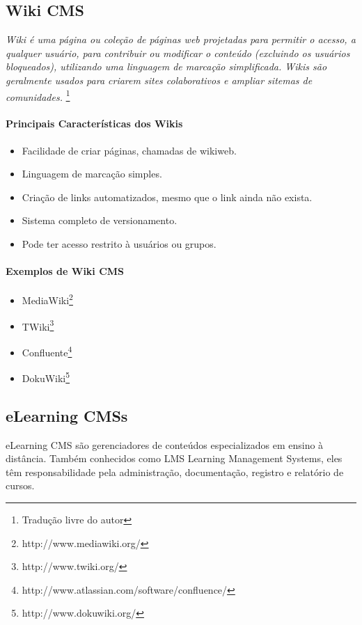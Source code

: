 \subsection{Wiki CMS} 

\emph{Wiki é uma página ou coleção de páginas web projetadas para permitir o acesso, a qualquer usuário, para contribuir ou modificar o conteúdo (excluindo os usuários bloqueados), utilizando uma linguagem de marcação simplificada. Wikis são geralmente usados para criarem sites colaborativos e ampliar sitemas de comunidades.}
\cite{choosing_open_source_cms}\footnote{Tradução livre do autor} 


\paragraph{Principais Características dos Wikis}

\begin{itemize}
  \item Facilidade de criar páginas, chamadas de wikiweb.
  \item Linguagem de marcação simples.
  \item Criação de links automatizados, mesmo que o link ainda não exista.
  \item Sistema completo de versionamento.
  \item Pode ter acesso restrito à usuários ou grupos.
\end{itemize}

\paragraph{Exemplos de Wiki CMS} 

\begin{itemize}
  \item MediaWiki\footnote{http://www.mediawiki.org/}
  \item TWiki\footnote{http://www.twiki.org/}
  \item Confluente\footnote{http://www.atlassian.com/software/confluence/}
  \item DokuWiki\footnote{http://www.dokuwiki.org/}
\end{itemize}


\subsection{eLearning CMSs} 

eLearning CMS são gerenciadores de conteúdos especializados em ensino à distância. Também conhecidos como LMS Learning Management Systems, eles têm responsabilidade pela administração, documentação, registro e relatório de cursos.
 
